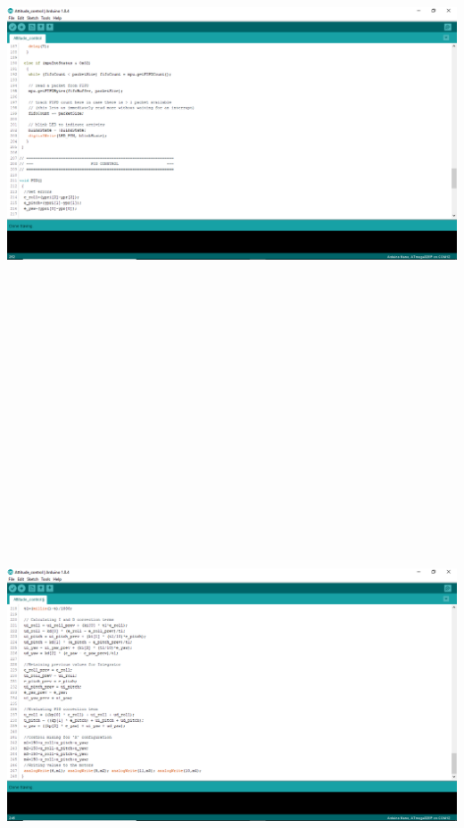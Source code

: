 \documentclass[9pt]{article}
\begin{document}
\begin{flushleft}
\newpage
\includegraphics[width=175mm,height=165mm]{29.jpg}
\newpage
\includegraphics[width=175mm,height=165mm]{30.jpg}

\end{flushleft}
\end{document}
